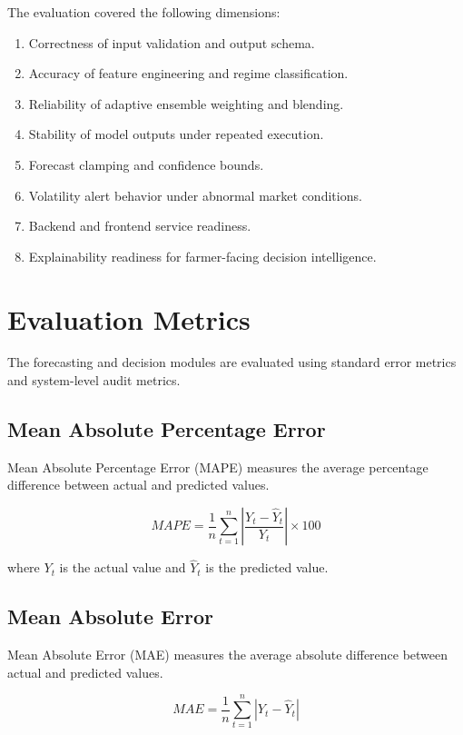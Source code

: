 \documentclass[12pt,a4paper]{report}
\begin{document}
The evaluation covered the following dimensions:

\begin{enumerate}
    \item Correctness of input validation and output schema.
    \item Accuracy of feature engineering and regime classification.
    \item Reliability of adaptive ensemble weighting and blending.
    \item Stability of model outputs under repeated execution.
    \item Forecast clamping and confidence bounds.
    \item Volatility alert behavior under abnormal market conditions.
    \item Backend and frontend service readiness.
    \item Explainability readiness for farmer-facing decision intelligence.
\end{enumerate}

\section{Evaluation Metrics}

The forecasting and decision modules are evaluated using standard error metrics and system-level audit metrics.

\subsection{Mean Absolute Percentage Error}

Mean Absolute Percentage Error (MAPE) measures the average percentage difference between actual and predicted values.

\begin{equation}
MAPE = \frac{1}{n} \sum_{t=1}^{n}
\left|
\frac{Y_t - \hat{Y}_t}{Y_t}
\right| \times 100
\end{equation}

where $Y_t$ is the actual value and $\hat{Y}_t$ is the predicted value.

\subsection{Mean Absolute Error}

Mean Absolute Error (MAE) measures the average absolute difference between actual and predicted values.

\begin{equation}
MAE = \frac{1}{n} \sum_{t=1}^{n} |Y_t - \hat{Y}_t|
\end{equation}
\end{document}
